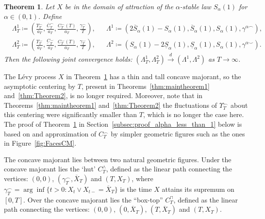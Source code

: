 \documentclass[10pt]{amsart}
\newtheorem{theo}{Theorem}[section]
\theoremstyle{definition}\newtheorem{defi}[theo]{Definition}\newtheorem{rema}[theo]{Remark}\newtheorem{exam}[theo]{Example}\newtheorem{exem}[theo]{Example}\newtheorem{nota}[theo]{Notation}
\newcommand\1{\mathds{1}}
\newcommand\cid{\xrightarrow{d}}
\newcommand\ov[1]{\overline{#1}}
\newcommand\un[1]{\underline{#1}}
\begin{document}
\begin{theo}\label{thm:Theorem3}
Let $X$ be in the domain of attraction of the $\alpha$-stable law $S_\alpha(1)$ for $\alpha\in(0,1)$. Define
\begin{align*}
&\Lambda_T^1
\coloneqq \left(\frac{\Upsilon_T^{\frown}}{a_T},
\frac{\ov{C}_T^\frown}{a_T},
\frac{C_T^\frown(T)}{a_T},
\frac{\gamma_T^\frown}{T}\right), &&\Lambda^1
\coloneqq \left(2\ov{S}_\alpha(1)-S_\alpha(1),
\ov{S}_\alpha(1), S_\alpha(1),
\gamma^{\alpha\frown}\right),\\
&\Lambda_T^2
\coloneqq \left(\frac{\Upsilon_T^{\smile}}{a_T},
\frac{\underbar{C}_T^\smile}{a_T},
\frac{C_T^\smile(T)}{a_T},
\frac{\gamma_T^\smile}{T}\right), &&\Lambda^2
\coloneqq \left(S_\alpha(1)-2\un{S}_\alpha(1),
\un{S}_\alpha(1), S_\alpha(1),
\gamma^{\alpha\smile} \right).
\end{align*}
Then the following joint convergence holds: $(\Lambda_T^1,\Lambda_T^2)\cid (\Lambda^1,\Lambda^2)$ as $T\to\infty$.
\end{theo}

The Lévy process $X$ in Theorem~\ref{thm:Theorem3} has a thin and tall concave majorant, so the asymptotic centering by $T$, present in Theorems~\ref{thm:maintheorem1} and~\ref{thm:Theorem2}, is no longer required. Moreover, note that in Theorems~\ref{thm:maintheorem1} and~\ref{thm:Theorem2} the fluctuations of $\Upsilon_T^\frown$ about this centering were significantly smaller than $T$, which is no longer the case here. The proof of Theorem~\ref{thm:Theorem3} in Section~\ref{subsec:proof_alpha_less_than_1} below is based on and approximation of $C_T^\frown$ by simpler geometric figures such as the ones in Figure~\ref{fig:FacesCM}.

The concave majorant lies between two natural geometric figures. Under the concave majorant lies the `hut' $C^\wedge_T$, defined as the linear path connecting the vertices: $(0,0)$, $(\gamma_T^\frown,\ov{X}_T)$ and $(T,X_T)$, where $\gamma_T^\frown=\arg\inf\{t>0:X_t\vee X_{t-}=\ov{X}_T\}$ is the time $X$ attains its supremum on $[0,T]$. Over the concave majorant lies the ``box-top'' $C^\sqcap_T$, defined as the linear path connecting the vertices: $(0,0)$, $(0,\ov{X}_T)$, $(T,\ov{X}_T)$ and $(T,X_T)$.
\end{document}
